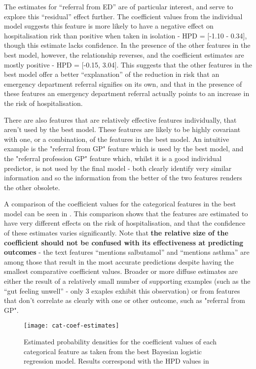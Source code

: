 The estimates for ``referral from ED'' are of particular interest, and serve to explore this ``residual'' effect further. The coefficient values from the individual model suggests this feature is more likely to have a negative effect on hospitalisation risk than positive when taken in isolation - HPD = [-1.10 - 0.34], though this estimate lacks confidence. In the presence of the other features in the best model, however, the relationship reverses, and the coefficient estimates are mostly positive - HPD = [-0.15, 3.04]. This suggests that the other features in the best model offer a better ``explanation'' of the reduction in risk that an emergency department referral signifies on its own, and that in the presence of these features an emergency department referral actually points to an increase in the risk of hospitalisation.

There are also features that are relatively effective features individually, that aren't used by the best model. These features are likely to be highly covariant with one, or a combination, of the features in the best model. An intuitive example is the "referral from GP" feature which is used by the best model, and the "referral profession GP" feature which, whilst it is a good individual predictor, is not used by the final model - both clearly identify very similar information and so the information from the better of the two features renders the other obsolete.

A comparison of the coefficient values for the categorical features in the best model can be seen in . This comparison shows that the features are estimated to have very different effects on the risk of hospitalisation, and that the confidence of these estimates varies significantly. Note that \textbf{the relative size of the coefficient should not be confused with its effectiveness at predicting outcomes} - the text features ``mentions salbutamol'' and ``mentions asthma'' are among those that result in the most accurate predictions despite having the smallest comparative coefficient values. Broader or more diffuse estimates are either the result of a relatively small number of supporting examples (such as the ``gut feeling unwell'' - only 3 exaples exhibit this observation) or from features that don't correlate as clearly with one or other outcome, such as "referral from GP".

   \begin{figure}[h]
       \centering
       \texttt{[image: cat-coef-estimates]}
       \caption[Coefficient estimates for categorical features]{Estimated probability densities for the coefficient values of each categorical feature as taken from the best Bayesian logistic regression model. Results correspond with the HPD values in }
       \label{fig:cat-coef-estimates}
   \end{figure}

